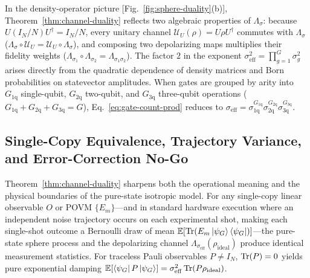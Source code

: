 In the density-operator picture [Fig.~\ref{fig:sphere-duality}(b)], Theorem~\ref{thm:channel-duality} reflects two algebraic properties of $\Lambda_\sigma$: because $U(I_N/N)U^\dagger = I_N/N$, every unitary channel $\mathcal{U}_U(\rho) = U\rho U^\dagger$ commutes with $\Lambda_\sigma$ ($\Lambda_\sigma \circ \mathcal{U}_U = \mathcal{U}_U \circ \Lambda_\sigma$), and composing two depolarizing maps multiplies their fidelity weights ($\Lambda_{\sigma_1} \circ \Lambda_{\sigma_2} = \Lambda_{\sigma_1\sigma_2}$). The factor $2$ in the exponent $\sigma_{\mathrm{eff}}^2 = \prod_{g=1}^G \sigma_g^2$ arises directly from the quadratic dependence of density matrices and Born probabilities on statevector amplitudes. When gates are grouped by arity into $G_{1\mathrm{q}}$ single-qubit, $G_{2\mathrm{q}}$ two-qubit, and $G_{3\mathrm{q}}$ three-qubit operations ($G_{1\mathrm{q}} + G_{2\mathrm{q}} + G_{3\mathrm{q}} = G$), Eq.~\eqref{eq:gate-count-prod} reduces to $\sigma_{\mathrm{eff}} = \sigma_{1\mathrm{q}}^{G_{1\mathrm{q}}}\sigma_{2\mathrm{q}}^{G_{2\mathrm{q}}}\sigma_{3\mathrm{q}}^{G_{3\mathrm{q}}}$.

\subsection{Single-Copy Equivalence, Trajectory Variance, and Error-Correction No-Go}
\label{sec:duality-physics}

Theorem~\ref{thm:channel-duality} sharpens both the operational meaning and the physical boundaries of the pure-state isotropic model. For any single-copy linear observable $O$ or POVM $\{E_m\}$---and in standard hardware execution where an independent noise trajectory occurs on each experimental shot, making each single-shot outcome a Bernoulli draw of mean $\mathbb{E}[\operatorname{Tr}(E_m \ket{\psi_G}\bra{\psi_G})]$---the pure-state sphere process and the depolarizing channel $\Lambda_{\sigma_{\mathrm{eff}}}(\rho_{\mathrm{ideal}})$ produce identical measurement statistics. For traceless Pauli observables $P \ne I_N$, $\operatorname{Tr}(P) = 0$ yields pure exponential damping $\mathbb{E}[\bra{\psi_G} P \ket{\psi_G}] = \sigma_{\mathrm{eff}}^2 \operatorname{Tr}(P \rho_{\mathrm{ideal}})$.

